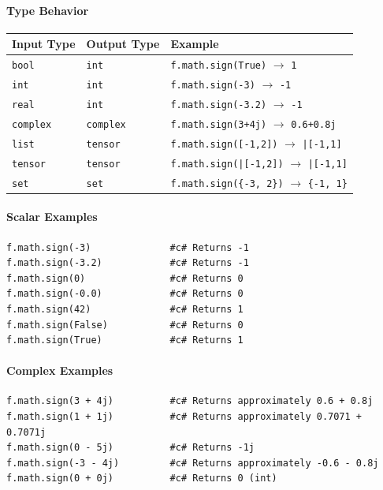 \paragraph{Type Behavior}
\begin{center}
\begin{tabular}{lll}
\textbf{Input Type} & \textbf{Output Type} & \textbf{Example} \\ \hline
\texttt{bool} & \texttt{int} & \texttt{f.math.sign(True)} $\to$ \texttt{1} \\
\texttt{int} & \texttt{int} & \texttt{f.math.sign(-3)} $\to$ \texttt{-1} \\
\texttt{real} & \texttt{int} & \texttt{f.math.sign(-3.2)} $\to$ \texttt{-1} \\
\texttt{complex} & \texttt{complex} & \texttt{f.math.sign(3+4j)} $\to$ \texttt{0.6+0.8j} \\
\texttt{list} & \texttt{tensor} & \texttt{f.math.sign([-1,2])} $\to$ \texttt{|[-1,1]} \\
\texttt{tensor} & \texttt{tensor} & \texttt{f.math.sign(|[-1,2])} $\to$ \texttt{|[-1,1]} \\
\texttt{set} & \texttt{set} & \texttt{f.math.sign(\{-3, 2\})} $\to$ \texttt{\{-1, 1\}} \\
\end{tabular}
\end{center}

\paragraph{Scalar Examples}
\begin{verbatim}
f.math.sign(-3)              #c# Returns -1
f.math.sign(-3.2)            #c# Returns -1
f.math.sign(0)               #c# Returns 0
f.math.sign(-0.0)            #c# Returns 0
f.math.sign(42)              #c# Returns 1
f.math.sign(False)           #c# Returns 0
f.math.sign(True)            #c# Returns 1
\end{verbatim}

\paragraph{Complex Examples}
\begin{verbatim}
f.math.sign(3 + 4j)          #c# Returns approximately 0.6 + 0.8j
f.math.sign(1 + 1j)          #c# Returns approximately 0.7071 + 0.7071j
f.math.sign(0 - 5j)          #c# Returns -1j
f.math.sign(-3 - 4j)         #c# Returns approximately -0.6 - 0.8j
f.math.sign(0 + 0j)          #c# Returns 0 (int)
\end{verbatim}

